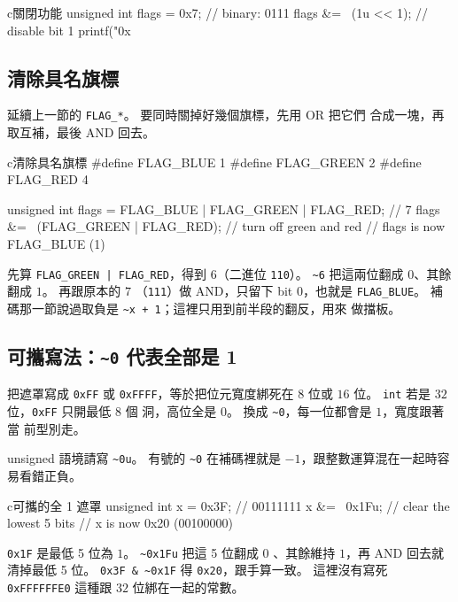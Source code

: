 \begin{code}{c}{關閉功能}
unsigned int flags = 0x7;  // binary: 0111
flags &= ~(1u << 1);      // disable bit 1
printf("0x%
\end{code}

\subsection{清除具名旗標}

延續上一節的 \texttt{FLAG\_*}。 要同時關掉好幾個旗標，先用 OR 把它們
合成一塊，再取互補，最後 AND 回去。

\begin{code}{c}{清除具名旗標}
#define FLAG_BLUE  1
#define FLAG_GREEN 2
#define FLAG_RED   4

unsigned int flags = FLAG_BLUE | FLAG_GREEN | FLAG_RED;  // 7
flags &= ~(FLAG_GREEN | FLAG_RED);   // turn off green and red
// flags is now FLAG_BLUE (1)
\end{code}

先算 \texttt{FLAG\_GREEN | FLAG\_RED}，得到 $6$（二進位 \texttt{110}）。
\texttt{\~{}6} 把這兩位翻成 $0$、其餘翻成 $1$。 再跟原本的 $7$
（\texttt{111}）做 AND，只留下 bit $0$，也就是 \texttt{FLAG\_BLUE}。
補碼那一節說過取負是 \texttt{\~{}x + 1}；這裡只用到前半段的翻反，用來
做擋板。

\subsection[可攜寫法：全部是 1 用 ~0]{可攜寫法：\texttt{\~{}0} 代表全部是 1}

把遮罩寫成 \texttt{0xFF} 或 \texttt{0xFFFF}，等於把位元寬度綁死在 $8$
位或 $16$ 位。 \texttt{int} 若是 $32$ 位，\texttt{0xFF} 只開最低 8 個
洞，高位全是 $0$。 換成 \texttt{\~{}0}，每一位都會是 $1$，寬度跟著當
前型別走。

unsigned 語境請寫 \texttt{\~{}0u}。 有號的 \texttt{\~{}0} 在補碼裡就是
$-1$，跟整數運算混在一起時容易看錯正負。

\begin{code}{c}{可攜的全 1 遮罩}
unsigned int x = 0x3F;     // 00111111
x &= ~0x1Fu;               // clear the lowest 5 bits
// x is now 0x20 (00100000)
\end{code}

\texttt{0x1F} 是最低 5 位為 $1$。 \texttt{\~{}0x1Fu} 把這 5 位翻成 $0$
、其餘維持 $1$，再 AND 回去就清掉最低 5 位。
\texttt{0x3F \& \~{}0x1F} 得 \texttt{0x20}，跟手算一致。 這裡沒有寫死
\texttt{0xFFFFFFE0} 這種跟 $32$ 位綁在一起的常數。

